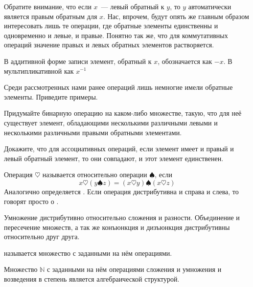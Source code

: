 Обратите внимание, что если $x$~--- левый обратный к $y$, то $y$ автоматически является правым обратным для $x$. Нас, впрочем, будут опять же главным образом интересовать лишь те операции, где обратные элементы единственны и одновременно и левые, и правые. Понятно так же, что для коммутативных операций значение правых и левых обратных элементов растворяется.

В аддитивной форме записи элемент, обратный к $x$, обозначается как $-x$. В мультипликативной как $x^{-1}$

\begin{exercise}
Среди рассмотренных нами ранее операций лишь немногие имели обратные элементы. Приведите примеры.
\end{exercise}

\begin{exercise}
Придумайте бинарную операцию на каком-либо множестве, такую, что для неё существует элемент, обладающими несколькими различными левыми и несколькими различными правыми обратными элементами.
\end{exercise}

\begin{exercise}
Докажите, что для ассоциативных операций, если элемент имеет и правый и левый обратный элемент, то они совпадают, и этот элемент единственен.
\end{exercise}

\begin{definition}
Операция $\heartsuit$ называется  относительно операции $\spadesuit$, если
$$x\heartsuit (y\spadesuit z) = (x\heartsuit y) \spadesuit (x \heartsuit z)$$
Аналогично определяется . Если операция дистрибутивна и справа и слева, то говорят просто о .
\end{definition}

\begin{example}
Умножение дистрибутивно относительно сложения и разности. Объединение и пересечение множеств, а так же конъюнкция и дизъюнкция дистрибутивны относительно друг друга.
\end{example}

\begin{definition}
	 называется множество с заданными на нём операциями.
\end{definition}

\begin{example}
	Множество $\mathbb{N}$ с заданными на нём операциями сложения и умножения и возведения в степень является алгебраической структурой.
\end{example}

